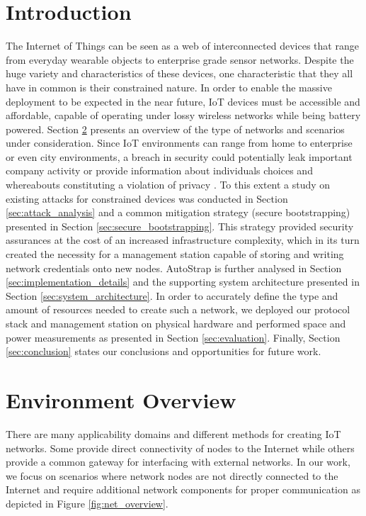 \documentclass{sig-alternate-05-2015}
\begin{document}
\section{Introduction}
The Internet of Things can be seen as a web of interconnected devices that range from everyday wearable objects to enterprise grade sensor networks. 
Despite the huge variety and characteristics of these devices, one characteristic that they all have in common is their constrained nature. 
In order to enable the massive deployment to be expected in the near future, \gls{IoT} devices must be accessible and affordable, capable of operating under lossy wireless networks while being battery powered. 
Section \ref{sec:network_overview} presents an overview of the type of networks and scenarios under consideration. 
Since \gls{IoT} environments can range from home to enterprise or even city environments, a breach in security could potentially leak important company activity or provide information about individuals choices and whereabouts constituting a violation of privacy \cite{Ukil2015}. 
To this extent a study on existing attacks for constrained devices was conducted in Section \ref{sec:attack_analysis} and a common mitigation strategy (secure bootstrapping) presented in Section \ref{sec:secure_bootstrapping}. 
This strategy provided security assurances at the cost of an increased infrastructure complexity, which in its turn created the necessity for a management station capable of storing and writing network credentials onto new nodes.
AutoStrap is further analysed in Section \ref{sec:implementation_details} and the supporting system architecture presented in Section \ref{sec:system_architecture}. In order to accurately define the type and amount of resources needed to create such a network, we deployed our protocol stack and management station on physical hardware and performed space and power measurements as presented in Section \ref{sec:evaluation}. 
Finally, Section \ref{sec:conclusion} states our conclusions and opportunities for future work.

\section{Environment Overview}
\label{sec:network_overview}
There are many applicability domains and different methods for creating \gls{IoT} networks. 
Some provide direct connectivity of nodes to the Internet while others provide a common gateway for interfacing with external networks. 
In our work, we focus on scenarios where network nodes are not directly connected to the Internet and require additional network components for proper communication as depicted in Figure \ref{fig:net_overview}.
\end{document}
